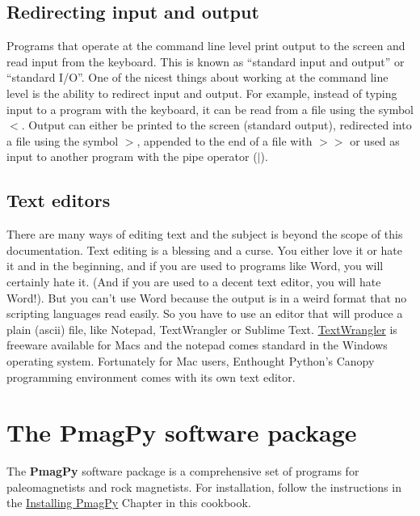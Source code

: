 \documentclass[11pt]{book}
\begin{document}
{

\section {Redirecting input and output}

Programs that operate at the command line level print  output to the screen and read input
from the keyboard. This is
known as ``standard input and output'' or ``standard I/O''.
One of the nicest things about working at the command line level is the ability to redirect input and output.
For example, instead of typing input to a program with the keyboard, it can
be read from a file using the symbol {\bf $<$}.   Output can either be printed to the screen (standard output), redirected into a file using the symbol {\bf $>$}, appended to the end of a file with {\bf $>>$} or
used as input to another program with the pipe operator ({\bf$ |$}).

\section{Text editors}

There are many ways of editing text and the subject is beyond the scope of this documentation. Text editing is a blessing and a curse.  You either love it or
hate it and in the beginning, and if you are used to programs like Word, you will certainly hate it. (And if you are used to a decent text editor, you will hate Word!).      But you can't use Word because the output is in a weird format that no scripting languages read easily.  So you have to use an editor that will produce a plain (ascii) file, like Notepad, TextWrangler or Sublime Text.  \href{http://textwrangler.onfreedownload.com}{TextWrangler}  is freeware available for Macs and the notepad comes standard in the Windows operating system.   Fortunately for Mac users, Enthought Python's Canopy programming environment comes with its own text editor.


\chapter{The {\bf PmagPy} software package}
\label{chap:PmagPy}

The {\bf PmagPy} software package is a comprehensive set of programs for paleomagnetists and rock magnetists.  For installation,  follow the instructions in the \href{#quick_start}{Installing PmagPy} Chapter in this cookbook.

}
\end{document}

